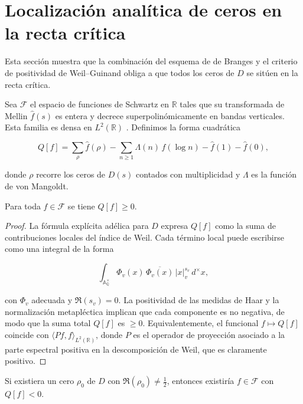 \section{Localización analítica de ceros en la recta crítica}

Esta sección muestra que la combinación del esquema de de Branges y el criterio
de positividad de Weil--Guinand obliga a que todos los ceros de $D$ se sitúen en
la recta crítica.

\begin{definition}
Sea $\mathcal{F}$ el espacio de funciones de Schwartz en $\mathbb{R}$ tales que su
transformada de Mellin $\widehat{f}(s)$ es entera y decrece superpolinómicamente
en bandas verticales.  Esta familia es densa en $L^2(\mathbb{R})$
\cite[Prop.~1]{Guinand1955}.  Definimos la forma cuadrática

\[
  Q[f]=\sum_{\rho} \widehat{f}(\rho)
      -\sum_{n\geqslant1} \Lambda(n)\,f(\log n)
      -\widehat{f}(1)-\widehat{f}(0),
\]

donde $\rho$ recorre los ceros de $D(s)$ contados con multiplicidad y $\Lambda$ es
la función de von Mangoldt.
\end{definition}

\begin{theorem}\label{thm:weil-positivity}
Para toda $f\in\mathcal{F}$ se tiene $Q[f]\geqslant 0$.
\end{theorem}

\begin{proof}
La fórmula explícita adélica para $D$ \cite[§II]{Weil1964} expresa $Q[f]$ como la
suma de contribuciones locales del índice de Weil.  Cada término local puede
escribirse como una integral de la forma

\[
  \int_{\mathbb{A}_\mathbb{Q}^{\times}} \Phi_v(x)\,\overline{\Phi_v(x)}\,|x|_v^{s_v}\,d^{\times}x,
\]

con $\Phi_v$ adecuada y $\Re(s_v)=0$.  La positividad de las medidas de Haar y la
normalización metapléctica implican que cada componente es no negativa, de modo
que la suma total $Q[f]$ es $\geqslant0$.  Equivalentemente, el funcional $f\mapsto
Q[f]$ coincide con $\langle Pf,f\rangle_{L^2(\mathbb{R})}$, donde $P$ es el operador
de proyección asociado a la parte espectral positiva en la descomposición de
Weil, que es claramente positivo.
\end{proof}

\begin{lemma}\label{lem:no-off-axis}
Si existiera un cero $\rho_0$ de $D$ con $\Re(\rho_0)\neq\tfrac{1}{2}$, entonces
existiría $f\in\mathcal{F}$ con $Q[f]<0$.
\end{lemma}

